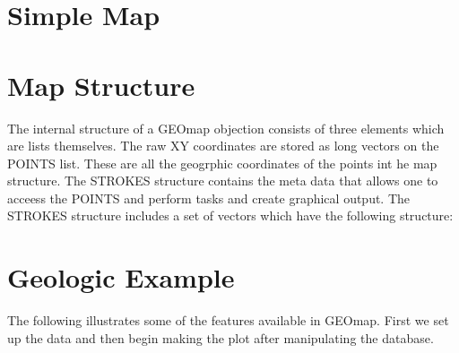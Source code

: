 \documentclass{article}
\begin{document}
\section{Simple Map}

\section{Map Structure}

The internal structure of a GEOmap objection consists of
three elements which are lists themselves.
The raw XY coordinates are stored as long vectors
on the POINTS list.  These are all the geogrphic coordinates of the 
points int he map structure.  
The STROKES structure contains the meta data that allows one to 
acceess the POINTS and perform tasks and create graphical output.
The STROKES structure includes a set of vectors which have the following structure:

\section{Geologic Example}

The following illustrates some of the features available in GEOmap.
First we set up the data and then begin making the plot after manipulating the 
database.
\end{document}

